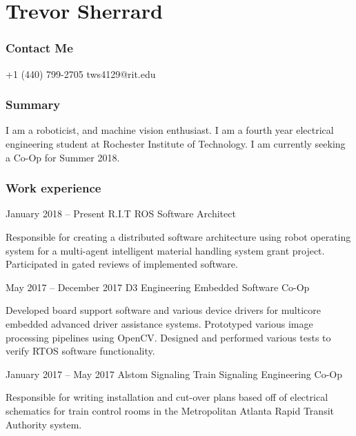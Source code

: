 \documentclass{tccv}
\begin{document}
\part{Trevor Sherrard}
\section{Contact Me}
\begin{eventlist}
    {+1 (440) 799-2705}
    {tws4129@rit.edu}
    
\end{eventlist}

\section{Summary}
I am a roboticist, and machine vision enthusiast. I am a fourth year electrical engineering student at Rochester Institute of Technology. I am currently seeking a Co-Op for Summer 2018. 

\section{Work experience}

\begin{eventlist}

\item{January 2018 -- Present}
     {R.I.T}
     {ROS Software Architect}
     
Responsible for creating a distributed software architecture using robot operating system for a multi-agent intelligent material handling system grant project. Participated in gated reviews of implemented software.   

\item{May 2017 -- December 2017}
     {D3 Engineering}
     {Embedded Software Co-Op}
     
Developed board support software and various device drivers for multicore embedded advanced driver assistance systems. Prototyped various image processing pipelines using OpenCV. Designed and performed various tests to verify RTOS software functionality.

\item{January 2017 -- May 2017}
     {Alstom Signaling}
     {Train Signaling Engineering Co-Op}

Responsible for writing installation and cut-over plans based off of electrical schematics for train control rooms in the Metropolitan Atlanta Rapid Transit Authority system.

\end{eventlist}
\end{document}
